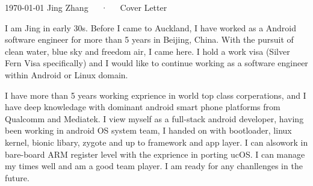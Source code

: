 \documentclass[12pt, a4paper]{awesome-cv}
\begin{document}
\makecvheader

\makecvfooter
  {\today}
  {Jing Zhang~~~·~~~Cover Letter}
  {}

\makelettertitle

\begin{cvletter}

I am Jing in early 30s. Before I came to Auckland, I have worked as a Android software engineer for more than 5 years in Beijing, China. With the pursuit of clean water, blue sky and freedom air, I came here. I hold a work visa (Silver Fern Visa specifically) and I would like to continue working as a software engineer within Android or Linux domain.


I have more than 5 years working exprience in world top class corperations, and I have deep knowledage with dominant android smart phone platforms from Qualcomm and Mediatek. I view myself as a full-stack android developer, having been working in android OS system team, I handed on with bootloader, linux kernel, bionic libary, zygote and up to framework and app layer. I can alsowork in bare-board ARM register level with the exprience in porting ucOS. I can manage my times well and am a good team player. I am ready for any chanllenges in the future. 

\end{cvletter}


\makeletterclosing
\end{document}
